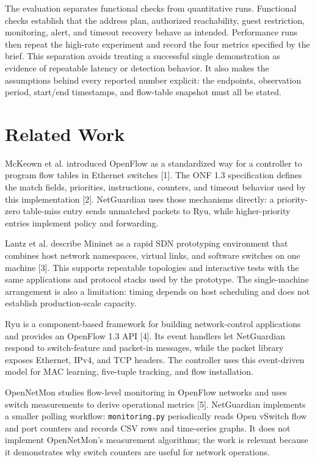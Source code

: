 \documentclass[conference]{IEEEtran}
\begin{document}
The evaluation separates functional checks from quantitative runs. Functional checks establish that the address plan, authorized reachability, guest restriction, monitoring, alert, and timeout recovery behave as intended. Performance runs then repeat the high-rate experiment and record the four metrics specified by the brief. This separation avoids treating a successful single demonstration as evidence of repeatable latency or detection behavior. It also makes the assumptions behind every reported number explicit: the endpoints, observation period, start/end timestamps, and flow-table snapshot must all be stated.

\section{Related Work}
McKeown et al. introduced OpenFlow as a standardized way for a controller to program flow tables in Ethernet switches [1]. The ONF 1.3 specification defines the match fields, priorities, instructions, counters, and timeout behavior used by this implementation [2]. NetGuardian uses those mechanisms directly: a priority-zero table-miss entry sends unmatched packets to Ryu, while higher-priority entries implement policy and forwarding.

Lantz et al. describe Mininet as a rapid SDN prototyping environment that combines host network namespaces, virtual links, and software switches on one machine [3]. This supports repeatable topologies and interactive tests with the same applications and protocol stacks used by the prototype. The single-machine arrangement is also a limitation: timing depends on host scheduling and does not establish production-scale capacity.

Ryu is a component-based framework for building network-control applications and provides an OpenFlow 1.3 API [4]. Its event handlers let NetGuardian respond to switch-feature and packet-in messages, while the packet library exposes Ethernet, IPv4, and TCP headers. The controller uses this event-driven model for MAC learning, five-tuple tracking, and flow installation.

OpenNetMon studies flow-level monitoring in OpenFlow networks and uses switch measurements to derive operational metrics [5]. NetGuardian implements a smaller polling workflow: \texttt{monitoring.py} periodically reads Open vSwitch flow and port counters and records CSV rows and time-series graphs. It does not implement OpenNetMon's measurement algorithms; the work is relevant because it demonstrates why switch counters are useful for network operations.
\end{document}
